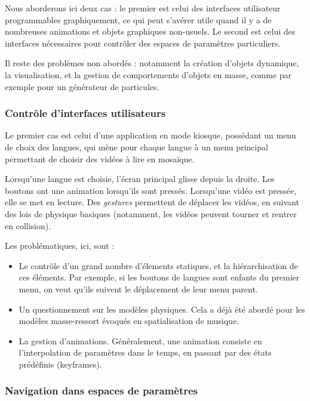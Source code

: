 \documentclass[french,12pt]{article}
\begin{document}
Nous aborderons ici deux cas : le premier est celui des interfaces utilisateur programmables graphiquement, ce qui peut s'avérer utile quand il y a de nombreuses animations et objets graphiques non-usuels. Le second est celui des interfaces nécessaires pour contrôler des espaces de paramètres particuliers.

Il reste des problèmes non abordés : notamment la création d'objets dynamique, la visualisation, et la gestion de comportements d'objets en masse, comme par exemple pour un générateur de particules.

\subsubsection{Contrôle d'interfaces utilisateurs}
Le premier cas est celui d'une application en mode kiosque, possédant un menu de choix des langues, qui mène pour chaque langue à un menu principal permettant de choisir des vidéos à lire en mosaïque.

Lorsqu'une langue est choisie, l'écran principal glisse depuis la droite. Les boutons ont une animation lorsqu'ils sont pressés. Lorsqu'une vidéo est pressée, elle se met en lecture. Des \textit{gestures} permettent de déplacer les vidéos, en suivant des lois de physique basiques (notamment, les vidéos peuvent tourner et rentrer en collision).

Les problématiques, ici, sont : 
\begin{itemize}
\item Le contrôle d'un grand nombre d'élements statiques, et la hiérarchisation de ces éléments. Par exemple, si les boutons de langues sont enfants du premier menu, on veut qu'ils suivent le déplacement de leur menu parent.
\item Un questionnement sur les modèles physiques. Cela a déjà été abordé pour les modèles masse-ressort évoqués en spatialisation de musique.
\item La gestion d'animations. Généralement, une animation consiste en l'interpolation de paramètres dans le temps, en passant par des états prédéfinis (keyframes).
\end{itemize}

\subsubsection{Navigation dans espaces de paramètres}
\end{document}
